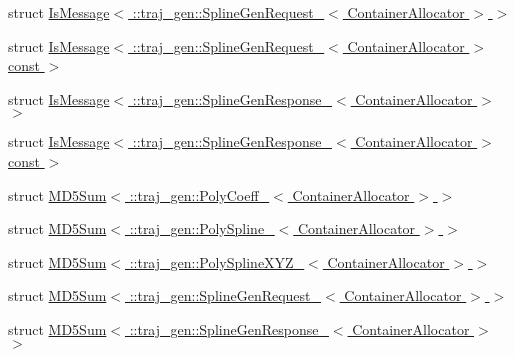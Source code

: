\begin{DoxyCompactItemize}
\item 
struct \hyperlink{structros_1_1message__traits_1_1_is_message_3_01_1_1traj__gen_1_1_spline_gen_request___3_01_container_allocator_01_4_01_4}{Is\+Message$<$ \+::traj\+\_\+gen\+::\+Spline\+Gen\+Request\+\_\+$<$ Container\+Allocator $>$ $>$}
\item 
struct \hyperlink{structros_1_1message__traits_1_1_is_message_3_01_1_1traj__gen_1_1_spline_gen_request___3_01_cont7d03306f145aa00d3e34e56fc26214ae}{Is\+Message$<$ \+::traj\+\_\+gen\+::\+Spline\+Gen\+Request\+\_\+$<$ Container\+Allocator $>$ const  $>$}
\item 
struct \hyperlink{structros_1_1message__traits_1_1_is_message_3_01_1_1traj__gen_1_1_spline_gen_response___3_01_container_allocator_01_4_01_4}{Is\+Message$<$ \+::traj\+\_\+gen\+::\+Spline\+Gen\+Response\+\_\+$<$ Container\+Allocator $>$ $>$}
\item 
struct \hyperlink{structros_1_1message__traits_1_1_is_message_3_01_1_1traj__gen_1_1_spline_gen_response___3_01_con7c3fec9481528da2d39b7d96e0147dbb}{Is\+Message$<$ \+::traj\+\_\+gen\+::\+Spline\+Gen\+Response\+\_\+$<$ Container\+Allocator $>$ const  $>$}
\item 
struct \hyperlink{structros_1_1message__traits_1_1_m_d5_sum_3_01_1_1traj__gen_1_1_poly_coeff___3_01_container_allocator_01_4_01_4}{M\+D5\+Sum$<$ \+::traj\+\_\+gen\+::\+Poly\+Coeff\+\_\+$<$ Container\+Allocator $>$ $>$}
\item 
struct \hyperlink{structros_1_1message__traits_1_1_m_d5_sum_3_01_1_1traj__gen_1_1_poly_spline___3_01_container_allocator_01_4_01_4}{M\+D5\+Sum$<$ \+::traj\+\_\+gen\+::\+Poly\+Spline\+\_\+$<$ Container\+Allocator $>$ $>$}
\item 
struct \hyperlink{structros_1_1message__traits_1_1_m_d5_sum_3_01_1_1traj__gen_1_1_poly_spline_x_y_z___3_01_container_allocator_01_4_01_4}{M\+D5\+Sum$<$ \+::traj\+\_\+gen\+::\+Poly\+Spline\+X\+Y\+Z\+\_\+$<$ Container\+Allocator $>$ $>$}
\item 
struct \hyperlink{structros_1_1message__traits_1_1_m_d5_sum_3_01_1_1traj__gen_1_1_spline_gen_request___3_01_container_allocator_01_4_01_4}{M\+D5\+Sum$<$ \+::traj\+\_\+gen\+::\+Spline\+Gen\+Request\+\_\+$<$ Container\+Allocator $>$ $>$}
\item 
struct \hyperlink{structros_1_1message__traits_1_1_m_d5_sum_3_01_1_1traj__gen_1_1_spline_gen_response___3_01_container_allocator_01_4_01_4}{M\+D5\+Sum$<$ \+::traj\+\_\+gen\+::\+Spline\+Gen\+Response\+\_\+$<$ Container\+Allocator $>$ $>$}
\end{DoxyCompactItemize}
